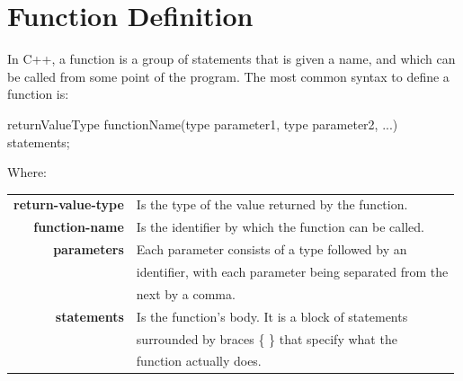 \documentclass[../lecture4-functions.tex]{subfiles}
\begin{document}
\section{Function Definition}


\begin{frame}[fragile]{}
    In C++, a function is a group of statements that is given a name, and which can be called from some point of the program. The most common syntax to define a function is: \newline

\begin{cppcode}
returnValueType functionName(type parameter1, type parameter2, ...)
{
    statements;
}
\end{cppcode}

    \vspace{0.5cm}
    Where:
    \begin{tabular}{rl}
        \textbf{return-value-type} & Is the type of the value returned by the function. \\
        \textbf{function-name}     & Is the identifier by which the function can be called. \\
        \textbf{parameters}        & Each parameter consists of a type followed by an \\
                                   & identifier,  with each parameter being separated from the \\
                                   & next by a comma. \\
        \textbf{statements}        & Is the function's body. It is a block of statements \\
                                   & surrounded by braces \{ \} that specify what the \\
                                   & function actually does. \\
    \end{tabular}
\end{frame}

\end{document}
